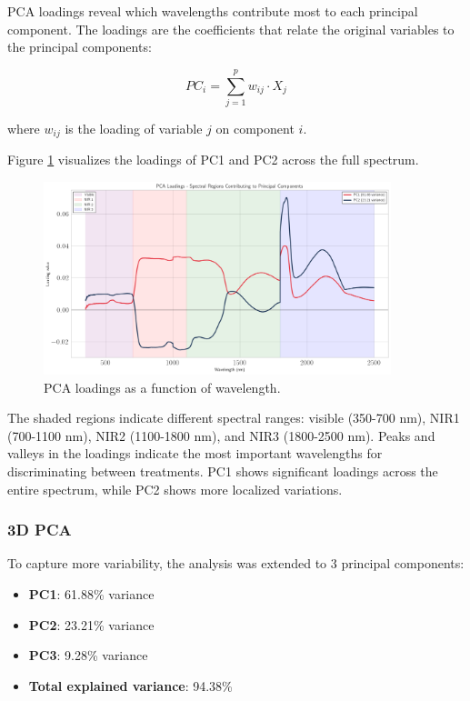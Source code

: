 \documentclass[12pt,a4paper]{article}
\begin{document}
PCA loadings reveal which wavelengths contribute most to each principal component. The loadings are the coefficients that relate the original variables to the principal components:

\begin{equation}
PC_i = \sum_{j=1}^{p} w_{ij} \cdot X_j
\end{equation}

where $w_{ij}$ is the loading of variable $j$ on component $i$.

Figure \ref{fig:pca_loadings} visualizes the loadings of PC1 and PC2 across the full spectrum.

\begin{figure}[H]
    \centering
    \includegraphics[width=0.9\textwidth]{Plots/2D_PCA_As_WaveLenghts.png}
    \caption{PCA loadings as a function of wavelength. }
    \label{fig:pca_loadings}
\end{figure}

The shaded regions indicate different spectral ranges: visible (350-700 nm), NIR1 (700-1100 nm), NIR2 (1100-1800 nm), and NIR3 (1800-2500 nm). Peaks and valleys in the loadings indicate the most important wavelengths for discriminating between treatments. PC1 shows significant loadings across the entire spectrum, while PC2 shows more localized variations.

\subsubsection{3D PCA}

To capture more variability, the analysis was extended to 3 principal components:

\begin{itemize}
    \item \textbf{PC1}: 61.88\% variance
    \item \textbf{PC2}: 23.21\% variance
    \item \textbf{PC3}: 9.28\% variance
    \item \textbf{Total explained variance}: 94.38\%
\end{itemize}
\end{document}
